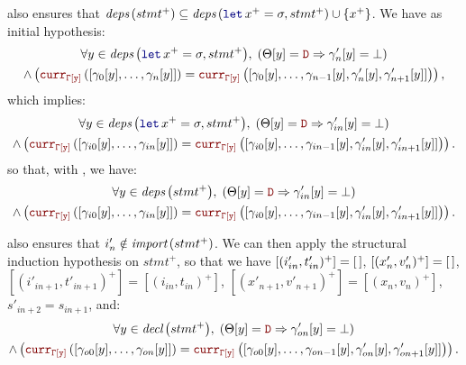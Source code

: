 \begin{skippableproof}
\begin{itemize}
               also ensures that
              $\depSet{stmt^+} \subseteq \depSet{\decl{x^+}{\sigma}, stmt^+} \cup \{x^+\}$. We have
              as initial hypothesis:
              \begin{multline*}
                  \forall y \in \depSet{\decl{x^+}{\sigma}, stmt^+}, \; \left(\Theta[y] = \dType \Rightarrow \gamma'_n[y] = \bot\right) \\
                  \wedge \left(\CurrVal{\tyCtx[y]}{[\gamma_0[y], \dots, \gamma_n[y]]} = \CurrVal{\tyCtx[y]}{[\gamma_0[y], \dots, \gamma_{n-1}[y], \gamma'_n[y], \gamma'_{n+1}[y]]}\right),
              \end{multline*}
              which implies:
              \begin{multline*}
                  \forall y \in \depSet{\decl{x^+}{\sigma}, stmt^+}, \; \left(\Theta[y] = \dType \Rightarrow \gamma'_{in}[y] = \bot\right) \\
                  \wedge \left(\CurrVal{\tyCtx[y]}{[\gamma_{i0}[y], \dots, \gamma_{in}[y]]} = \CurrVal{\tyCtx[y]}{[\gamma_{i0}[y], \dots, \gamma_{in-1}[y], \gamma'_{in}[y], \gamma'_{in+1}[y]]}\right).
              \end{multline*}
              so that, with , we have:
              \begin{multline*}
                  \forall y \in \depSet{stmt^+}, \; \left(\Theta[y] = \dType \Rightarrow \gamma'_{in}[y] = \bot\right) \\
                  \wedge \left(\CurrVal{\tyCtx[y]}{[\gamma_{i0}[y], \dots, \gamma_{in}[y]]} = \CurrVal{\tyCtx[y]}{[\gamma_{i0}[y], \dots, \gamma_{in-1}[y], \gamma'_{in}[y], \gamma'_{in+1}[y]]}\right).
              \end{multline*}

               also ensures that
              $i'_n \notin {\ensuremath{\textit{import}\left(stmt^+\right)}}$. We can then apply the structural induction
              hypothesis on $stmt^+$, so that we have $[(i'_{in}, t'_{in})^+] = [\,]$,
              $[(x'_n, v'_n)^+] = [\,]$, $[(i'_{in+1}, t'_{in+1})^+] =
                  [(i_{in}, t_{in})^+]$, $[(x'_{n+1}, v'_{n+1})^+] = [(x_n, v_n)^+]$,
              $s'_{in+2} = s_{in+1}$, and:
              \begin{multline*}
                  \forall y \in \declSet{stmt^+}, \; \left(\Theta[y] = \dType \Rightarrow \gamma'_{on}[y] = \bot\right) \\
                  \wedge \left(\CurrVal{\tyCtx[y]}{[\gamma_{o0}[y], \dots, \gamma_{on}[y]]} = \CurrVal{\tyCtx[y]}{[\gamma_{o0}[y], \dots, \gamma_{on-1}[y], \gamma'_{on}[y], \gamma'_{on+1}[y]]}\right).
              \end{multline*}


\end{itemize}
\end{skippableproof}
